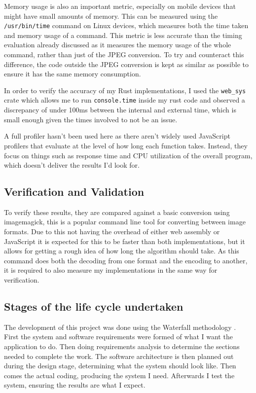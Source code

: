 \documentclass[12pt,a4paper]{article}
\begin{document}
Memory usage is also an important metric, especially on mobile devices that might have small amounts of memory. This can be measured using the \texttt{/usr/bin/time} command on Linux devices, which measures both the time taken and memory usage of a command. This metric is less accurate than the timing evaluation already discussed as it measures the memory usage of the whole command, rather than just of the JPEG conversion. To try and counteract this difference, the code outside the JPEG conversion is kept as similar as possible to ensure it has the same memory consumption.

In order to verify the accuracy of my Rust implementations, I used the \texttt{web\_sys} crate which allows me to run \texttt{console.time} inside my rust code and observed a discrepancy of under 100ms between the internal and external time, which is small enough given the times involved to not be an issue.

A full profiler hasn't been used here as there aren't widely used JavaScript profilers that evaluate at the level of how long each function takes. Instead, they focus on things such as response time and CPU utilization of the overall program, which doesn't deliver the results I'd look for.


\subsection{Verification and Validation}

To verify these results, they are compared against a basic conversion using imagemagick, this is a popular command line tool for converting between image formats. Due to this not having the overhead of either web assembly or JavaScript it is expected for this to be faster than both implementations, but it allows for getting a rough idea of how long the algorithm should take. As this command does both the decoding from one format and the encoding to another, it is required to also measure my implementations in the same way for verification.

\subsection{Stages of the life cycle undertaken}

The development of this project was done using the Waterfall methodology \cite{royce1987managing}. First the system and software requirements were formed of what I want the application to do. Then doing requirements analysis to determine the sections needed to complete the work. The software architecture is then planned out during the design stage, determining what the system should look like. Then comes the actual coding, producing the system I need. Afterwards I test the system, ensuring the results are what I expect.
\end{document}
